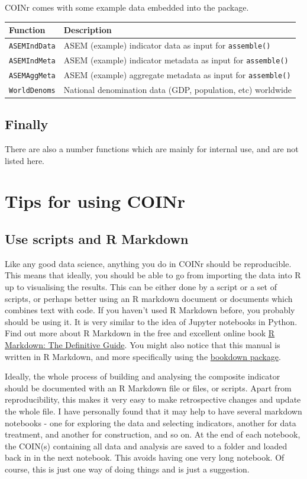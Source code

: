 \documentclass[
]{book}
\begin{document}
COINr comes with some example data embedded into the package.

\begin{longtable}[]{@{}ll@{}}
\toprule
Function & Description\tabularnewline
\midrule
\endhead
\texttt{ASEMIndData} & ASEM (example) indicator data as input for \texttt{assemble()}\tabularnewline
\texttt{ASEMIndMeta} & ASEM (example) indicator metadata as input for \texttt{assemble()}\tabularnewline
\texttt{ASEMAggMeta} & ASEM (example) aggregate metadata as input for \texttt{assemble()}\tabularnewline
\texttt{WorldDenoms} & National denomination data (GDP, population, etc) worldwide\tabularnewline
\bottomrule
\end{longtable}

\hypertarget{finally}{%
\subsection{Finally}\label{finally}}

There are also a number functions which are mainly for internal use, and are not listed here.

\hypertarget{tips-for-using-coinr}{%
\section{Tips for using COINr}\label{tips-for-using-coinr}}

\hypertarget{use-scripts-and-r-markdown}{%
\subsection{Use scripts and R Markdown}\label{use-scripts-and-r-markdown}}

Like any good data science, anything you do in COINr should be reproducible. This means that ideally, you should be able to go from importing the data into R up to visualising the results. This can be either done by a script or a set of scripts, or perhaps better using an R markdown document or documents which combines text with code. If you haven't used R Markdown before, you probably should be using it. It is very similar to the idea of Jupyter notebooks in Python. Find out more about R Markdown in the free and excellent online book \href{https://bookdown.org/yihui/rmarkdown/}{R Markdown: The Definitive Guide}. You might also notice that this manual is written in R Markdown, and more specifically using the \href{https://bookdown.org/yihui/bookdown/}{bookdown package}.

Ideally, the whole process of building and analysing the composite indicator should be documented with an R Markdown file or files, or scripts. Apart from reproducibility, this makes it very easy to make retrospective changes and update the whole file. I have personally found that it may help to have several markdown notebooks - one for exploring the data and selecting indicators, another for data treatment, and another for construction, and so on. At the end of each notebook, the COIN(s) containing all data and analysis are saved to a folder and loaded back in in the next notebook. This avoids having one very long notebook. Of course, this is just one way of doing things and is just a suggestion.
\end{document}
